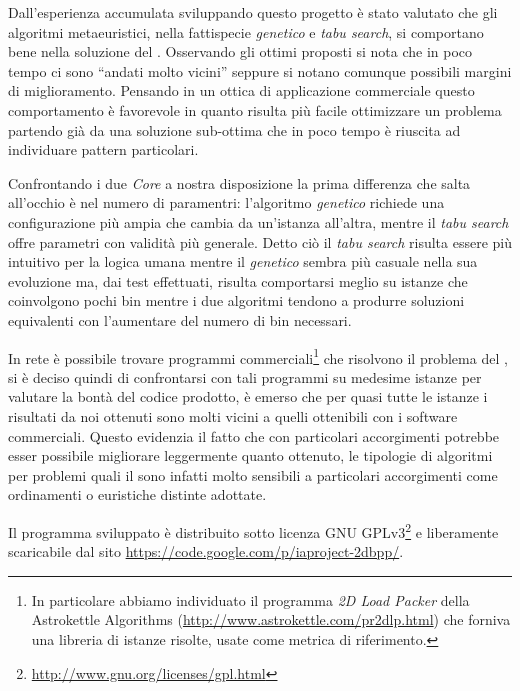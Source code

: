 Dall'esperienza accumulata sviluppando questo progetto è stato valutato che gli algoritmi metaeuristici, nella fattispecie \emph{genetico} e \emph{tabu search}, si comportano bene nella soluzione del \ddbpp. Osservando gli ottimi proposti si nota che in poco tempo ci sono ``andati molto vicini'' seppure si notano comunque possibili margini di miglioramento. Pensando in un ottica di applicazione commerciale questo comportamento è favorevole in quanto risulta più facile ottimizzare un problema partendo già da una soluzione sub-ottima che in poco tempo è riuscita ad individuare pattern particolari.

Confrontando i due \emph{Core} a nostra disposizione la prima differenza che salta all'occhio è nel numero di paramentri: l'algoritmo \emph{genetico} richiede una configurazione più ampia che cambia da un'istanza all'altra, mentre il \emph{tabu search} offre parametri con validità più generale. Detto ciò il \emph{tabu search} risulta essere più intuitivo per la logica umana mentre il \emph{genetico} sembra più casuale nella sua evoluzione ma, dai test effettuati, risulta comportarsi meglio su istanze che coinvolgono pochi bin mentre i due algoritmi tendono a produrre soluzioni equivalenti con l'aumentare del numero di bin necessari.

In rete è possibile trovare programmi commerciali\footnote{In particolare abbiamo individuato il programma \emph{2D Load Packer} della Astrokettle Algorithms (\url{http://www.astrokettle.com/pr2dlp.html}) che forniva una libreria di istanze risolte, usate come metrica di riferimento.} che risolvono il problema del \ddbp, si è deciso quindi di confrontarsi con tali programmi su medesime istanze per valutare la bontà del codice prodotto, è emerso che per quasi tutte le istanze i risultati da noi ottenuti sono molti vicini a quelli ottenibili con i software commerciali. Questo evidenzia il fatto che con particolari accorgimenti potrebbe esser possibile migliorare leggermente quanto ottenuto, le tipologie di algoritmi per problemi quali il \ddbp sono infatti molto sensibili a particolari accorgimenti come ordinamenti o euristiche distinte adottate.

Il programma sviluppato è distribuito sotto licenza GNU GPLv3\footnote{\url{http://www.gnu.org/licenses/gpl.html}} e liberamente scaricabile dal sito \url{https://code.google.com/p/iaproject-2dbpp/}.